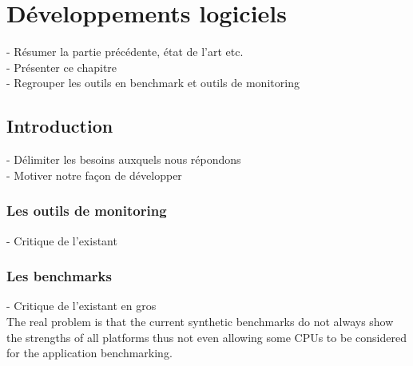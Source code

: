 \chapter{Développements logiciels}\label{chap:dev}
\minitoc


- Résumer la partie précédente, état de l'art etc.\\
- Présenter ce chapitre\\
- Regrouper les outils en benchmark et outils de monitoring\\


\section{Introduction}

- Délimiter les besoins auxquels nous répondons\\
- Motiver notre façon de développer\\

\subsection{Les outils de monitoring}

- Critique de l'existant\\


\subsection{Les benchmarks}

- Critique de l'existant en gros\\

    The real problem is that the current synthetic benchmarks do not always show the strengths of all platforms thus not even allowing some CPUs to be considered for the application benchmarking.










\printbibliography[heading=references,segment=\therefsegment]
